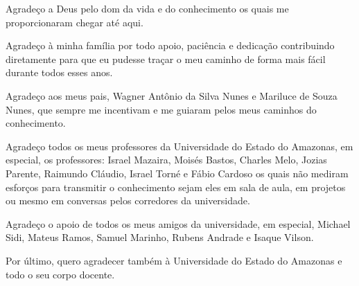 
\begin{agradecimentos}[AGRADECIMENTOS]

Agradeço a Deus pelo dom da vida e do conhecimento os quais me proporcionaram chegar até aqui.

Agradeço à minha família por todo apoio, paciência e dedicação contribuindo diretamente para que eu pudesse traçar o meu caminho de forma mais fácil durante todos esses anos.

Agradeço aos meus pais, Wagner Antônio da Silva Nunes e Mariluce de Souza Nunes, que sempre me incentivam e me guiaram pelos meus caminhos do conhecimento.

Agradeço todos os meus professores da Universidade do Estado do Amazonas, em especial, os professores: Israel Mazaira, Moisés Bastos, Charles Melo, Jozias Parente, Raimundo Cláudio, Israel Torné e Fábio Cardoso os quais não mediram esforços para transmitir o conhecimento sejam eles em sala de aula, em projetos ou mesmo em conversas pelos corredores da universidade.

Agradeço o apoio de todos os meus amigos da universidade, em especial, Michael Sidi, Mateus Ramos, Samuel Marinho, Rubens Andrade e Isaque Vilson.

Por último, quero agradecer também à Universidade do Estado do Amazonas e todo o seu corpo docente.


\end{agradecimentos}
